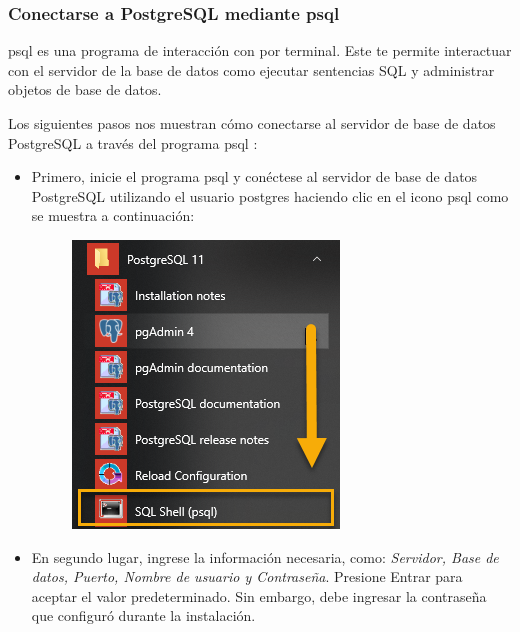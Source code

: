 \documentclass[10pt]{article}
\newcommand{\postgres}[1]{{\textcolor{R}{PostgreSQL} #1}}
\newcommand{\psql}[1]{{\textcolor{B}{psql} #1}}
\begin{document}
\subsubsection{Conectarse a \postgres{} mediante \psql{}}
\psql{} es una programa de interacción con por terminal.
Este te permite interactuar con el servidor de la base de datos 
como ejecutar sentencias SQL y administrar objetos de base de datos.


Los siguientes pasos nos muestran cómo conectarse al servidor de base de datos \postgres{} a través del programa \psql{}:

\begin{itemize}

\item 
Primero, inicie el programa \psql{} y conéctese al servidor de base de datos \postgres{} utilizando el usuario postgres haciendo clic en el icono \psql{} como se muestra a continuación:

\begin{figure}[H]
  \begin{center}
  	 \includegraphics{figures/cap2/img1.png}	 
	 \renewcommand{\arraystretch}{1.3}
  \end{center}
\end{figure}


\item En segundo lugar, ingrese la información necesaria, como: \textit{Servidor, Base de datos, Puerto, Nombre de usuario y Contraseña}. Presione Entrar para aceptar el valor predeterminado. Sin embargo, debe ingresar la contraseña que configuró durante la instalación.




\end{itemize}
\end{document}
